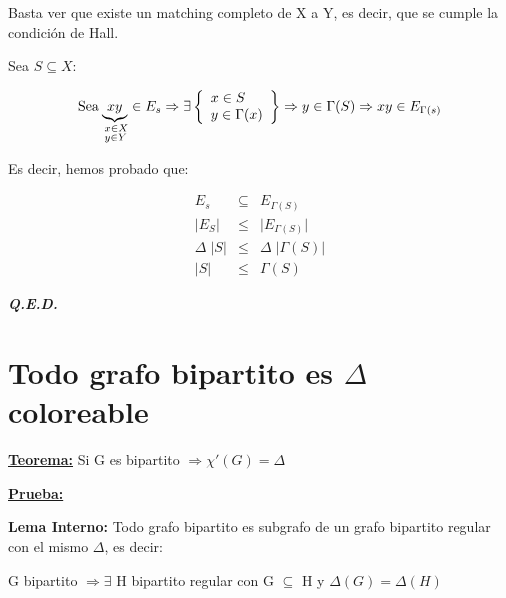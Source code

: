 \documentclass[12pt,a4paper]{report}
\newcommand{\QED}{\hfill \textit{\textbf{Q.E.D.}}}
\begin{document}
			\vspace{3mm}
			\par Basta ver que existe un matching completo de X a Y, es decir, que se cumple la condición de Hall.

			\vspace{5mm}
			\par Sea $S \subseteq X$:

			\begin{equation*}
				\text{Sea}
				\underbrace{xy}_{\begin{subarray}{l} \; x \in X \\
				\; y \in Y \end{subarray}} \in E_{s} \Rightarrow
				{\Huge \exists}
	  		\left\lbrace
	  		\begin{array}{l}
	    			x \in S \\
	     		  y \in \Gamma(x) \\
	  		\end{array}
	 			\right\rbrace
	 			\Rightarrow y \in \Gamma(S) \Rightarrow xy \in E_{\Gamma(s)}
			\end{equation*}

			\vspace{3mm}
			\par Es decir, hemos probado que:

			\begin{eqnarray}
				\nonumber E_{s} &\subseteq & E_{\Gamma(S)} \\
				\nonumber \lvert E_{S} \rvert &\leq & \lvert E_{\Gamma(S)} \rvert \\
				\nonumber \Delta \; \lvert S \rvert &\leq & \Delta \; \lvert \Gamma(S) \rvert \\
				\nonumber \lvert S \rvert &\leq & \Gamma(S)
			\end{eqnarray}

		\QED

	\section{Todo grafo bipartito es $\Delta$ coloreable}
		\textbf{\underline{Teorema:}} Si G es bipartito $\Rightarrow \chi '(G) = \Delta $

		\textbf{\underline{Prueba:}}

			\vspace{3mm}
			\textbf{Lema Interno:} Todo grafo bipartito es subgrafo de un grafo bipartito regular con el mismo $\Delta$, es decir:
				\begin{center}
					G bipartito $\Rightarrow \exists$ H bipartito regular con G $\subseteq$ H y $\Delta(G) = \Delta(H)$
				\end{center}
\end{document}
